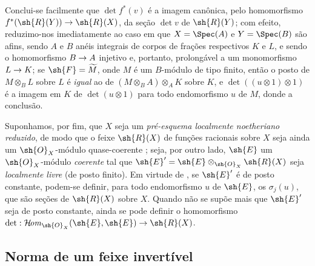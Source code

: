 \documentclass[oneside,10pt]{amsart}
\makeatletter
\newcommand{\ega@arrow}[2]{\mathchoice{#1}{#2}{#2}{#2}}
\renewcommand{\to}{\ega@arrow{\longrightarrow}{\rightarrow}}
\def\shHom{\mathcal{H}\!\mathit{om}}
\let\EGAOriginalLabel\label
\renewcommand{\label}[1]{\phantomsection\EGAOriginalLabel{#1}}
\makeatother
\begin{document}
\begin{env}[6.4.9]
Conclui-se facilmente que $\det f^*(v)$ é a imagem canônica, pelo homomorfismo $f^*(\sh{R}(Y))\to\sh{R}(X)$, da seção $\det v$ de $\sh{R}(Y)$;
com efeito, reduzimo-nos imediatamente ao caso em que $X=\Spec(A)$ e $Y=\Spec(B)$ são afins, sendo $A$ e $B$ anéis integrais de corpos de frações respectivos $K$ e $L$, e sendo o homomorfismo $B\to A$ injetivo e, portanto, prolongável a um monomorfismo $L\to K$;
se $\sh{F}=\widetilde{M}$, onde $M$ é um $B$-módulo de tipo finito, então o posto de $M\otimes_B L$ sobre $L$ é \emph{igual} ao de $(M\otimes_B A)\otimes_A K$ sobre $K$, e $\det((u\otimes1)\otimes1)$ é a imagem em $K$ de $\det(u\otimes1)$ para todo endomorfismo $u$ de $M$, donde a conclusão.
\end{env}

\begin{env}[6.4.10]
\label{II.6.4.10}
Suponhamos, por fim, que $X$ seja um \emph{pré-esquema localmente noetheriano reduzido}, de modo que o feixe $\sh{R}(X)$ de funções racionais sobre $X$ seja ainda um $\sh{O}_X$-módulo quase-coerente ;
seja, por outro lado, $\sh{E}$ um $\sh{O}_X$-módulo \emph{coerente} tal que $\sh{E}'=\sh{E}\otimes_{\sh{O}_X}\sh{R}(X)$ seja \emph{localmente livre} (de posto finito).
Em virtude de , se $\sh{E}'$ é de posto constante, podem-se definir, para todo endomorfismo $u$ de $\sh{E}$, os $\sigma_j(u)$, que são seções de $\sh{R}(X)$ sobre $X$.
Quando não se supõe mais que $\sh{E}'$ seja de posto constante, ainda se pode definir o homomorfismo $\det:\shHom_{\sh{O}_X}(\sh{E},\sh{E})\to\sh{R}(X)$.
\end{env}

\subsection{Norma de um feixe invertível}
\label{subsection:II.6.5}
\end{document}
